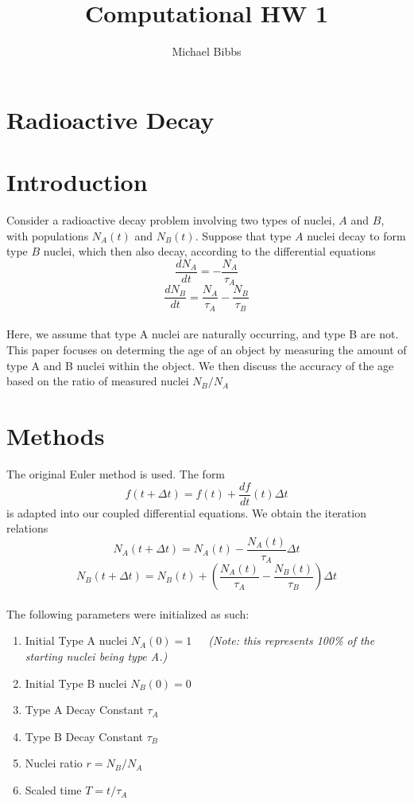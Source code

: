 \documentclass{article}
\title{Computational HW 1}
\author{Michael Bibbs}
\begin{document}
	\maketitle
	\section*{Radioactive Decay}
	\section{Introduction}
	Consider a radioactive decay problem involving two types of nuclei, $A$ and $B$, with populations $N_A(t)$ and $N_B(t)$. Suppose that type $A$ nuclei decay to form type $B$ nuclei, which then also decay, according to the differential equations
	\begin{equation}
		\frac{dN_A}{dt}=-\frac{N_A}{\tau_A}
	\end{equation}
	\begin{equation}
		\frac{dN_B}{dt}=\frac{N_A}{\tau_A}-\frac{N_B}{\tau_B}
	\end{equation}
	\\\indent Here, we assume that type A nuclei are naturally occurring, and type B are not. This paper focuses on determing the age of an object by measuring the amount of type A and B nuclei within the object. We then discuss the accuracy of the age based on the ratio of measured nuclei $N_B / N_A$
	\section{Methods}
	\indent The original Euler method is used. The form
	\[f(t+\Delta t)=f(t)+\frac{df}{dt}(t)\Delta t\]
	\indent is adapted into our coupled differential equations. We obtain the iteration relations
	\begin{equation}
		N_A(t+\Delta t) = N_A(t) -\frac{N_A(t)}{\tau_A}\Delta t
	\end{equation}
	\begin{equation}
		N_B(t+\Delta t) = N_B(t)+\left(\frac{N_A(t)}{\tau_A}-\frac{N_B(t)}{\tau_B}\right)\Delta t
	\end{equation}\\
	\indent The following parameters were initialized as such:
	\begin{enumerate}
		\item Initial Type A nuclei $N_A(0) = 1$~~~{\textit{\footnotesize (Note: this represents 100\% of the starting nuclei being type A.)}}
		\item Initial Type B nuclei $N_B(0) = 0$
		\item Type A Decay Constant $\tau_A$
		\item Type B Decay Constant $\tau_B$ 
		\item Nuclei ratio $r=N_B/N_A$
		\item Scaled time $T = t/\tau_A$
	\end{enumerate}
	
\end{document}

